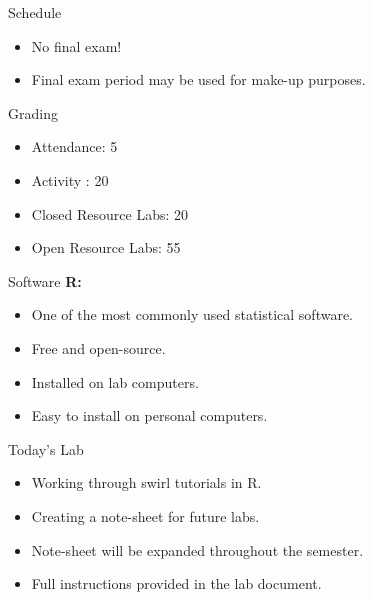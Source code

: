 \documentclass{beamer}
\begin{document}
\begin{frame}{Schedule}
\begin{itemize}
    \item No final exam!
    \item Final exam period may be used for make-up purposes.
\end{itemize}
\end{frame}

\begin{frame}{Grading}
\begin{itemize}
    \item Attendance: 5%
    \item Activity : 20 %
    \item Closed Resource Labs: 20%
    \item Open Resource Labs: 55%
\end{itemize}
\end{frame}

\begin{frame}{Software}
\textbf{R:}
\begin{itemize}
    \item One of the most commonly used statistical software.
    \item Free and open-source.
    \item Installed on lab computers.
    \item Easy to install on personal computers.
\end{itemize}
\end{frame}



\begin{frame}{Today’s Lab}
\begin{itemize}
    \item Working through swirl tutorials in R.
    \item Creating a note-sheet for future labs.
    \item Note-sheet will be expanded throughout the semester.
    \item Full instructions provided in the lab document.
\end{itemize}
\end{frame}
\end{document}
